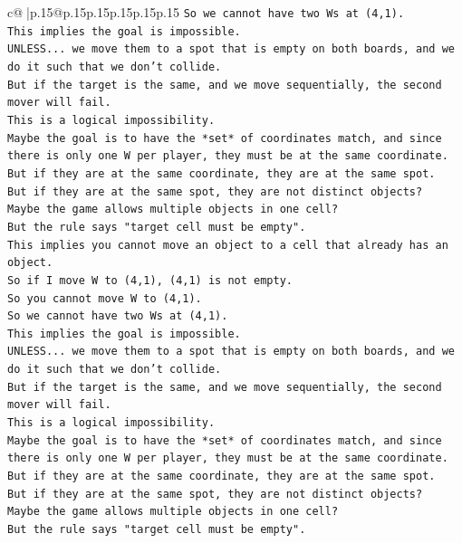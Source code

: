 \documentclass{article}
\begin{document}
{\begin{supertabular}{c@{$\;$}|p{.15\linewidth}@{}p{.15\linewidth}p{.15\linewidth}p{.15\linewidth}p{.15\linewidth}p{.15\linewidth}}
{{{\texttt{So we cannot have two Ws at (4,1).} \\
\texttt{This implies the goal is impossible.} \\
\texttt{UNLESS... we move them to a spot that is empty on both boards, and we do it such that we don't collide.} \\
\texttt{But if the target is the same, and we move sequentially, the second mover will fail.} \\
\texttt{This is a logical impossibility.} \\
\texttt{Maybe the goal is to have the *set* of coordinates match, and since there is only one W per player, they must be at the same coordinate.} \\
\texttt{But if they are at the same coordinate, they are at the same spot.} \\
\texttt{But if they are at the same spot, they are not distinct objects?} \\
\texttt{Maybe the game allows multiple objects in one cell?} \\
\texttt{But the rule says "target cell must be empty".} \\
\texttt{This implies you cannot move an object to a cell that already has an object.} \\
\texttt{So if I move W to (4,1), (4,1) is not empty.} \\
\texttt{So you cannot move W to (4,1).} \\
\texttt{So we cannot have two Ws at (4,1).} \\
\texttt{This implies the goal is impossible.} \\
\texttt{UNLESS... we move them to a spot that is empty on both boards, and we do it such that we don't collide.} \\
\texttt{But if the target is the same, and we move sequentially, the second mover will fail.} \\
\texttt{This is a logical impossibility.} \\
\texttt{Maybe the goal is to have the *set* of coordinates match, and since there is only one W per player, they must be at the same coordinate.} \\
\texttt{But if they are at the same coordinate, they are at the same spot.} \\
\texttt{But if they are at the same spot, they are not distinct objects?} \\
\texttt{Maybe the game allows multiple objects in one cell?} \\
\texttt{But the rule says "target cell must be empty".} \\
}}}
\end{supertabular}}
\end{document}

